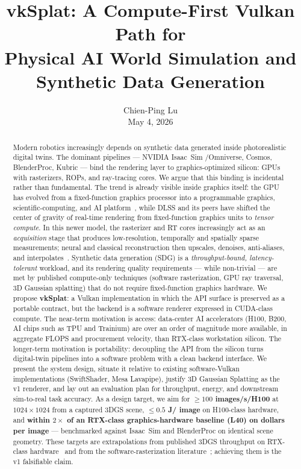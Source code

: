 \documentclass[10pt,journal]{IEEEtran}
\title{vkSplat: A Compute-First Vulkan Path for\\Physical AI World Simulation and Synthetic Data Generation}
\author{%
    Chien-Ping Lu\\[0.35em]
    \normalsize May 4, 2026%
}
\begin{document}
\maketitle

\begin{abstract}
Modern robotics increasingly depends on synthetic data generated inside
photorealistic digital twins. The dominant pipelines --- NVIDIA Isaac~Sim
\slash Omniverse, Cosmos, BlenderProc, Kubric --- bind the rendering layer to
graphics-optimized silicon: GPUs with rasterizers, ROPs, and ray-tracing
cores. We argue that this binding is incidental rather than fundamental.
The trend is already visible inside graphics itself: the GPU has evolved
from a fixed-function graphics processor into a programmable graphics,
scientific-computing, and AI platform~\cite{dally2021gpu}, while DLSS and
its peers have shifted the center of gravity of real-time rendering from
fixed-function graphics units to \emph{tensor compute}. In this newer
model, the rasterizer and RT cores increasingly act as an
\emph{acquisition} stage that produces low-resolution, temporally and
spatially sparse measurements; neural and classical reconstruction then
upscales, denoises, anti-aliases, and
interpolates~\cite{nvidia-dlss,liu2020nsrr,nvidia-dlss3,schied2017svgf,bitterli2020restir}.
Synthetic data generation (SDG) is a \emph{throughput-bound,
latency-tolerant} workload, and its rendering quality requirements --- while
non-trivial --- are met by published compute-only techniques (software
rasterization, GPU ray traversal, 3D Gaussian splatting) that do not require
fixed-function graphics hardware. We propose \textbf{vkSplat}: a Vulkan
implementation in which the API surface is preserved as a portable contract,
but the backend is a software renderer expressed in CUDA-class compute. The
near-term motivation is access: data-center AI accelerators (H100, B200, AI
chips such as TPU and Trainium) are over an order of magnitude more available,
in aggregate FLOPS and procurement velocity, than RTX-class workstation
silicon. The longer-term motivation is portability: decoupling the API from
the silicon turns digital-twin pipelines into a software problem with a clean
backend interface. We present the system design, situate it relative to
existing software-Vulkan implementations (SwiftShader, Mesa Lavapipe), justify
3D Gaussian Splatting as the v1 renderer, and lay out an evaluation plan for
throughput, energy, and downstream sim-to-real task accuracy. As a
design target, we aim for \textbf{$\geq 100$ images\slash s\slash H100} at
$1024{\times}1024$ from a captured 3DGS scene, \textbf{$\leq 0.5$ J\slash
image} on H100-class hardware, and \textbf{within $2{\times}$ of an
RTX-class graphics-hardware baseline (L40) on dollars per image} ---
benchmarked against Isaac~Sim and BlenderProc on identical scene
geometry. These targets are extrapolations from published 3DGS
throughput on RTX-class hardware~\cite{kerbl20233dgs} and from the
software-rasterization literature~\cite{laine2011software}; achieving
them is the v1 falsifiable claim.
\end{abstract}
\end{document}
